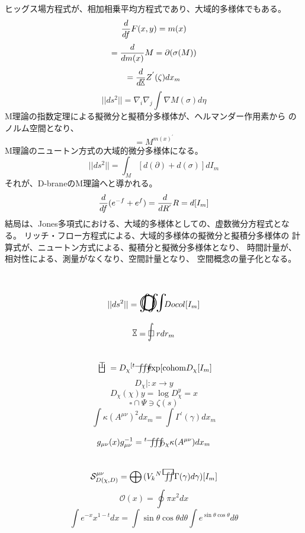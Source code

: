 \documentclass{jsarticle}
\begin{document}
     ヒッグス場方程式が、相加相乗平均方程式であり、大域的多様体でもある。
  $$ {d \over {df}}F(x,y)=m(x) $$
  $$ = {d \over {d m(x)}}M = \partial (\sigma(M)) $$
  $$=  {d \over {d \timebow}}Z^{'}(\zeta)dx_m $$
  $$ ||ds^2|| = \nabla_{i}\nabla_{j}\int \nabla M(\sigma)d\eta $$
  M理論の指数定理による擬微分と擬積分多様体が、ヘルマンダー作用素から
  のノルム空間となり、
  $$ = M^{{m(x)^{'}}} $$
  M理論のニュートン方式の大域的微分多様体になる。
  $$ ||ds^2|| = \int_M [d(\partial) + d(\sigma)]dI_m $$
  それが、D-braneのM理論へと導かれる。
  $$ {d \over {df}}(e^{-f} + e^{f}) = {{d \over {d R^{'}}}}R = d[I_m] $$
  結局は、Jones多項式における、大域的多様体としての、虚数微分方程式となる。
  リッチ・フロー方程式による、大域的多様体の擬微分と擬積分多様体の
  計算式が、ニュートン方式による、擬積分と擬微分多様体となり、
  時間計量が、相対性による、測量がなくなり、空間計量となり、
  空間概念の量子化となる。
$$ ||ds^2|| = \whitewithbodercircleiiint Docol[I_m] $$

 	
$$ \timebow = \flowerletter r dr_m $$
$$ \dazanier = D_{\chi}{}^{[t}\variiint \mathrm{exp}[\mathrm{cohom}
D_{\chi}[I_m] $$ 
$$ D_{\chi} |: x \to y $$
$$ D_{\chi}(\chi)y = \log D_{\chi}^{y} = x $$
$$ \square \cap \Psi \ni  \zeta(s) $$
$$ \int \kappa (A^{\mu\nu})^{2}dx_m = \int \Gamma^{'}(\gamma)dx_m $$
$$ g_{\mu\nu}(x)g^{-1}_{\mu\nu} = {}^{t}\variiint_{D\chi}\kappa
(A^{\mu\nu})dx_m $$
$$  \mathcal{S}^{\mu\nu}_{D(\chi,D)} = \bigoplus {(V_{k}{}^{N}\squareiint
\Gamma(\gamma)d\gamma)}[I_m] $$
$$ \mathcal{O}(x) = \oint \pi x^2 dx $$
$$ \int e^{-x}x^{1-t}dx = \int \sin \theta \cos \theta d \theta \int e^{\sin \theta \cos \theta}d\theta $$
\end{document}
